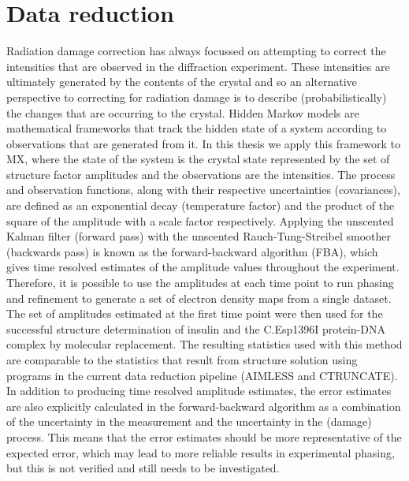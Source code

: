 \section{Data reduction}
\label{sec:Data Reduction}
Radiation damage correction has always focussed on attempting to correct the intensities that are observed in the diffraction experiment.
These intensities are ultimately generated by the contents of the crystal and so an alternative perspective to correcting for radiation damage is to describe (probabilistically) the changes that are occurring to the crystal.
Hidden Markov models are mathematical frameworks that track the hidden state of a system according to observations that are generated from it.
In this thesis we apply this framework to MX, where the state of the system is the crystal state represented by the set of structure factor amplitudes and the observations are the intensities.
The process and observation functions, along with their respective uncertainties (covariances), are defined as an exponential decay (temperature factor) and the product of the square of the amplitude with a scale factor respectively.
Applying the unscented Kalman filter (forward pass) with the unscented Rauch-Tung-Streibel smoother (backwards pass) is known as the forward-backward algorithm (FBA), which gives time resolved estimates of the amplitude values throughout the experiment.
Therefore, it is possible to use the amplitudes at each time point to run phasing and refinement to generate a set of electron density maps from a single dataset.
The set of amplitudes estimated at the first time point were then used for the successful structure determination of insulin and the C.Esp1396I protein-DNA complex by molecular replacement.
The resulting statistics used with this method are comparable to the statistics that result from structure solution using programs in the current data reduction pipeline (AIMLESS and CTRUNCATE).
In addition to producing time resolved amplitude estimates, the error estimates are also explicitly calculated in the forward-backward algorithm as a combination of the uncertainty in the measurement and the uncertainty in the (damage) process.
This means that the error estimates should be more representative of the expected error, which may lead to more reliable results in experimental phasing, but this is not verified and still needs to be investigated.

